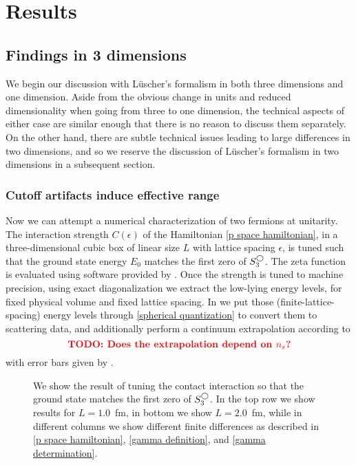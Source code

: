 \section{Results}

\subsection{Findings in 3 dimensions}
We begin our discussion with L\"uscher's formalism in both three dimensions and one dimension.  Aside from the obvious change in units and reduced dimensionality when going from three to one dimension, the technical aspects of either case are similar enough that there is no reason to discuss them separately.  On the other hand, there are subtle technical issues leading to large differences in two dimensions, and so we reserve the discussion of L\"uscher's formalism in two dimensions in a subsequent section.


\subsubsection{Cutoff artifacts induce effective range}

Now we can attempt a numerical characterization of {\color{red} two} fermions at unitarity.
The interaction strength $C(\epsilon)$ of the Hamiltonian \eqref{p space hamiltonian}, in a three-dimensional cubic box of linear size $L$ with lattice spacing $\epsilon$, is tuned such that the ground state energy $E_0$ matches the first zero of $S^{\bigcirc}_3$.
The zeta function is evaluated using software provided by .
Once the strength is tuned to machine precision, using exact diagonalization we extract the low-lying energy levels, for fixed physical volume and fixed lattice spacing.
In  we put those (finite-lattice-spacing) energy levels through \eqref{spherical quantization} to convert them to scattering data, and additionally perform a continuum extrapolation according to
\begin{equation}
    \text{{\bf\color{red}TODO: Does the extrapolation depend on \ensuremath{{n_s}}?}}
\end{equation}
with error bars given by .  

\begin{figure}[th]
    
    \caption{We show the result of tuning the contact interaction so that the ground state matches the first zero of $S^{\bigcirc}_3$.  In the top row we show results for $L=1.0$~fm, in bottom we show $L=2.0$~fm, while in different columns we show different finite differences as described in \eqref{p space hamiltonian}, \eqref{gamma definition}, and \eqref{gamma determination}. }
    \label{fig:unimproved spherical}
\end{figure}

